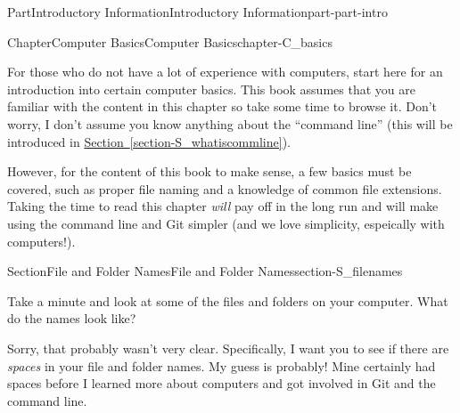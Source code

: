 \documentclass[oneside,10pt,]{book}
\newcommand{\xreffont}{\relax}
\begin{document}
\setcounter{tocdepth}{0}
\renewcommand*\contentsname{Contents}
\tableofcontents
\mainmatter
%
%
\typeout{************************************************}
\typeout{************************************************}
%
\begin{partptx}{Part}{Introductory Information}{}{Introductory Information}{}{}{part-part-intro}
\renewcommand*{\partname}{Part}
%
\typeout{************************************************}
\typeout{************************************************}
%
\begin{chapterptx}{Chapter}{Computer Basics}{}{Computer Basics}{}{}{chapter-C_basics}
\renewcommand*{\chaptername}{Chapter}
\begin{introduction}{}%
For those who do not have a lot of experience with computers, start here for an introduction into certain computer basics. This book assumes that you are familiar with the content in this chapter so take some time to browse it. Don't worry, I don't assume you know anything about the ``command line'' (this will be introduced in \hyperref[section-S_whatiscommline]{Section~{\xreffont\ref{section-S_whatiscommline}}}).%
\par
However, for the content of this book to make sense, a few basics must be covered, such as proper file naming and a knowledge of common file extensions. Taking the time to read this chapter \emph{will} pay off in the long run and will make using the command line and Git simpler (and we love simplicity, espeically with computers!).%
\end{introduction}%
%
%
\typeout{************************************************}
\typeout{************************************************}
%
\begin{sectionptx}{Section}{File and Folder Names}{}{File and Folder Names}{}{}{section-S_filenames}
%
%
\begin{introduction}{}%
Take a minute and look at some of the files and folders on your computer. What do the names look like?%
\par
Sorry, that probably wasn't very clear. Specifically, I want you to see if there are \emph{spaces} in your file and folder names. My guess is probably! Mine certainly had spaces before I learned more about computers and got involved in Git and the command line.%
\par

\end{introduction}
\end{sectionptx}
\end{chapterptx}
\end{partptx}
\end{document}
